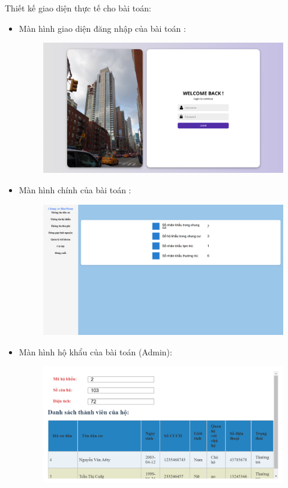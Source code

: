 \documentclass{article}
\begin{document}
Thiết kế giao diện thực tế cho bài toán:
\begin{itemize}
    \item Màn hình giao diện đăng nhập của bài toán :
    \begin{figure}[H]
        \centering
        \includegraphics[width=1\textwidth]{Ảnh chương 4/Login.png}
    \end{figure}
    \vspace{7cm}
    \item Màn hình chính của bài toán :
    \begin{figure}[H]
        \centering
        \includegraphics[width=1\textwidth]{Ảnh chương 4/Home Admin.png}
    \end{figure}
    \vspace{1cm}
    \item Màn hình hộ khẩu của bài toán (Admin):
    \begin{figure}[H]
        \centering
        \includegraphics[width=1\textwidth]{Ảnh chương 4/Thông tin hộ khẩu Admin.png}

\end{figure}
\end{itemize}
\end{document}
